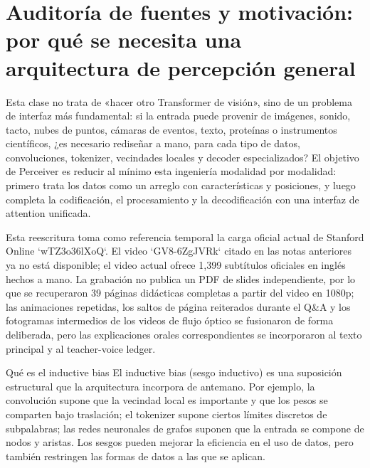 \section{Auditoría de fuentes y motivación: por qué se necesita una arquitectura de percepción general}

Esta clase no trata de «hacer otro Transformer de visión», sino de un problema de interfaz más fundamental: si la entrada puede provenir de imágenes, sonido, tacto, nubes de puntos, cámaras de eventos, texto, proteínas o instrumentos científicos, ¿es necesario rediseñar a mano, para cada tipo de datos, convoluciones, tokenizer, vecindades locales y decoder especializados? El objetivo de Perceiver es reducir al mínimo esta ingeniería modalidad por modalidad: primero trata los datos como un arreglo con características y posiciones, y luego completa la codificación, el procesamiento y la decodificación con una interfaz de attention unificada.

Esta reescritura toma como referencia temporal la carga oficial actual de Stanford Online `wTZ3o36lXoQ`. El video `GV8-6ZgJVRk` citado en las notas anteriores ya no está disponible; el video actual ofrece 1,399 subtítulos oficiales en inglés hechos a mano. La grabación no publica un PDF de slides independiente, por lo que se recuperaron 39 páginas didácticas completas a partir del video en 1080p; las animaciones repetidas, los saltos de página reiterados durante el Q\&A y los fotogramas intermedios de los videos de flujo óptico se fusionaron de forma deliberada, pero las explicaciones orales correspondientes se incorporaron al texto principal y al teacher-voice ledger.


\begin{knowledgebox}{Qué es el inductive bias}
El inductive bias (sesgo inductivo) es una suposición estructural que la arquitectura incorpora de antemano. Por ejemplo, la convolución supone que la vecindad local es importante y que los pesos se comparten bajo traslación; el tokenizer supone ciertos límites discretos de subpalabras; las redes neuronales de grafos suponen que la entrada se compone de nodos y aristas. Los sesgos pueden mejorar la eficiencia en el uso de datos, pero también restringen las formas de datos a las que se aplican.
\end{knowledgebox}

